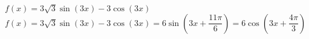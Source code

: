 {$f(x) = 3\sqrt{3}\sin(3x) - 3\cos(3x)$}
{$f(x) = 3\sqrt{3}\sin(3x) - 3\cos(3x) = 6\sin\left(3x + \dfrac{11\pi}{6}\right) = 6\cos\left(3x + \dfrac{4\pi}{3}\right)$}
